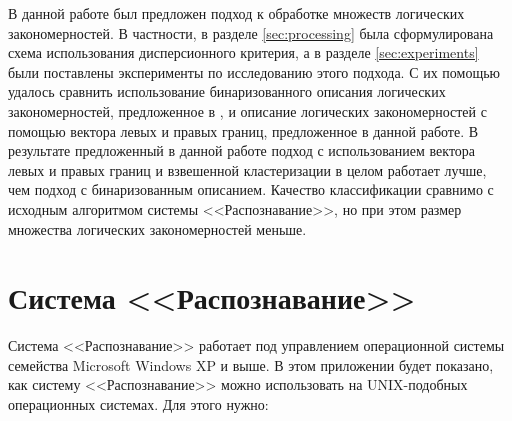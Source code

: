 \documentclass[12pt]{article}
\begin{document}



В данной работе был предложен подход к обработке множеств логических
закономерностей. В частности, в разделе \ref{sec:processing} была
сформулирована схема использования дисперсионного критерия, а в
разделе \ref{sec:experiments} были поставлены эксперименты по
исследованию этого подхода. С их помощью удалось сравнить
использование бинаризованного описания логических закономерностей,
предложенное в \cite{novikov15}, и описание логических закономерностей
с помощью вектора левых и правых границ, предложенное в данной работе.
В результате предложенный в данной работе подход с использованием
вектора левых и правых границ и взвешенной кластеризации в целом
работает лучше, чем подход с бинаризованным описанием. Качество
классификации сравнимо с исходным алгоритмом системы
<<Распознавание>>, но при этом размер множества логических
закономерностей меньше.

\newpage

\appendix
\section{Система <<Распознавание>>}
Система <<Распознавание>> \cite{recognition06} работает под
управлением операционной системы семейства Microsoft Windows XP и
выше. В этом приложении будет показано, как систему <<Распознавание>>
можно использовать на UNIX-подобных операционных системах. Для этого
нужно:
\end{document}
